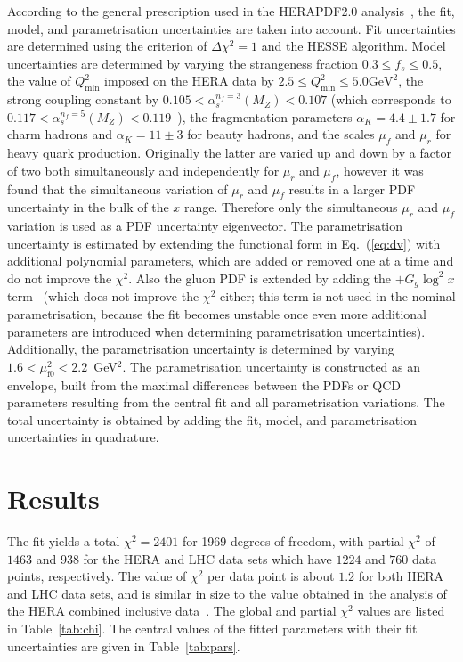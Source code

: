 \documentclass[12pt]{article}
\begin{document}
According to the general prescription used in the HERAPDF2.0 analysis~\cite{Abramowicz:2015mha}, 
the fit, model, and parametrisation uncertainties are taken into account.
Fit uncertainties are determined using the criterion of $\Delta\chi^2 = 1$ and the HESSE algorithm.
Model uncertainties are determined by varying the strangeness fraction $0.3 \leq f_{s} \leq 0.5$, the value of $Q^2_{\text{min}}$ imposed on the HERA data by $2.5 \leq Q^2_\textrm{min}\leq 5.0\textrm{GeV}^2$, the strong coupling constant by $0.105 < \alpha_s^{n_f=3}(M_Z) < 0.107$ (which corresponds to $0.117 < \alpha_s^{n_f=5}(M_Z) < 0.119$~\cite{Tanabashi:2018oca}), the fragmentation parameters $\alpha_K = 4.4 \pm 1.7$ for charm hadrons and $\alpha_K = 11 \pm 3$ for beauty hadrons, and the scales $\mu_f$ and $\mu_r$ for heavy quark production.
Originally the latter are varied up and down by a factor of two both simultaneously and independently for $\mu_r$ and $\mu_f$, however it was found that the simultaneous variation of $\mu_r$ and $\mu_f$ results in a larger PDF uncertainty in the bulk of the $x$ range. 
Therefore only the simultaneous $\mu_r$ and $\mu_f$ variation is used as a PDF uncertainty eigenvector.
The parametrisation uncertainty is estimated by extending the functional form in Eq.~(\ref{eq:dv}) with additional polynomial parameters, which are added or removed one at a time and do not improve the $\chi^2$. 
Also the gluon PDF is extended by adding the $+G_g\log^2 x$ term~\cite{Bonvini:2019wxf} (which does not improve the $\chi^2$ either; this term is not used in the nominal parametrisation, because the fit becomes unstable once even more additional parameters are introduced when determining parametrisation uncertainties).
Additionally, the parametrisation uncertainty is determined by varying $1.6 < \mu_\mathrm{f0}^2 < 2.2$~GeV$^2$.
The parametrisation uncertainty is constructed as an envelope, built from the maximal differences between the PDFs or QCD parameters resulting from the central fit and all parametrisation variations.
The total uncertainty is obtained by adding the fit, model, and parametrisation uncertainties in quadrature.

\section{Results}
\label{sec:results}

The fit yields a total $\chi^2 =2401$ for 1969 degrees of freedom, with partial $\chi^2$ of $1463$ and $938$ for the HERA and LHC data sets which have $1224$ and $760$ data points, respectively. The value
of $\chi^2$ per data point is about $1.2$ for both HERA and LHC data sets, and is similar in size to the value obtained in the analysis of the HERA combined inclusive data~\cite{Abramowicz:2015mha}. The global and partial $\chi^2$ values are listed in Table~\ref{tab:chi}. 
The central values of the fitted parameters with their fit uncertainties are given in Table~\ref{tab:pars}.
\end{document}
